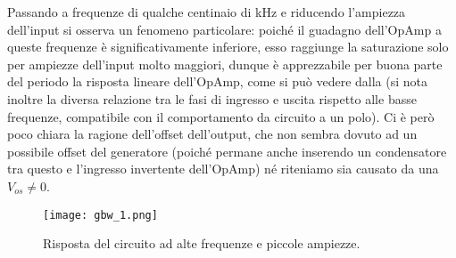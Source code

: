 Passando a frequenze di qualche centinaio di \si{\kHz} e riducendo l'ampiezza dell'input si osserva un fenomeno particolare: poiché il guadagno dell'OpAmp a queste frequenze è significativamente inferiore, esso raggiunge la saturazione solo per ampiezze dell'input molto maggiori, dunque è apprezzabile per buona parte del periodo la risposta lineare dell'OpAmp, come si può vedere dalla  (si nota inoltre la diversa relazione tra le fasi di ingresso e uscita rispetto alle basse frequenze, compatibile con il comportamento da circuito a un polo). Ci è però poco chiara la ragione dell'offset dell'output, che non sembra dovuto ad un possibile offset del generatore (poiché permane anche inserendo un condensatore tra questo e l'ingresso invertente dell'OpAmp) né riteniamo sia causato da una $V_{os} \neq 0$. %

\begin{figure}[h]
	\centering
	\texttt{[image: gbw\_1.png]}
	\caption{Risposta del circuito ad alte frequenze e piccole ampiezze.}
	\label{f:gbw}
\end{figure}

